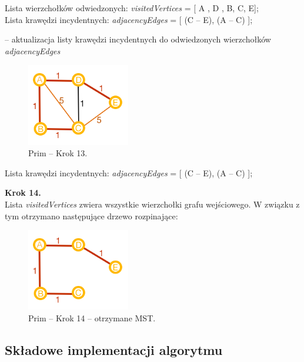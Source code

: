 \begin{center}
	Lista wierzchołków odwiedzonych: \emph{visitedVertices} = [ A , D , B, C, E];\\
	Lista krawędzi incydentnych: \emph{adjacencyEdges} = [ (C -- E), (A -- C) ];\\
\end{center}
-- aktualizacja listy krawędzi incydentnych do odwiedzonych wierzchołków \emph{adjacencyEdges}
\begin{figure}[htb!]
	\centering
	\includegraphics[width=0.4\textwidth]{tex/fig/graf11}
	\caption{Prim -- Krok 13.}
	\label{fig: g11}
\end{figure}
\begin{center}
	Lista krawędzi incydentnych: \emph{adjacencyEdges} = [ (C -- E), (A -- C) ];\\
\end{center}
\newpage
\textbf{Krok 14.}\\
Lista \emph{visitedVertices} zwiera wszystkie wierzchołki grafu wejściowego. W związku z tym otrzymano następujące drzewo rozpinające:\\
\begin{figure}[htb!]
	\centering
	\includegraphics[width=0.4\textwidth]{tex/fig/graf12}
	\caption{Prim -- Krok 14 -- otrzymane MST.}
	\label{fig: g14}
\end{figure}
\newpage
\subsection{Składowe implementacji algorytmu}

